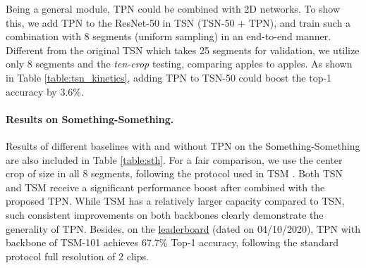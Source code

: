 \documentclass[10pt,twocolumn,letterpaper]{article}
\begin{document}
Being a general module, TPN could be combined with 2D networks.
To show this, we add TPN to the ResNet-50 \cite{resnet} in TSN (TSN-50 + TPN), and train such a combination with 8 segments (uniform sampling) in an end-to-end manner.
Different from the original TSN \cite{tsn} which takes 25 segments for validation, we utilize only 8 segments and the \emph{ten-crop} testing, comparing apples to apples.
As shown in Table \ref{table:tsn_kinetics}, adding TPN to TSN-50 could boost the top-1 accuracy by 3.6\%.


\paragraph{Results on Something-Something.}
\begin{table}[t]
    \begin{center}
    \end{center}
    \caption{
        \textbf{Results on the validation set of Something-Something V1 \& V2.} Note that results on V1 \& V2 take the center crop of 1 clip/video according to \cite{tsm}.
        }
    \label{table:sth}
\end{table}
Results of different baselines with and without TPN on the Something-Something are also included in Table \ref{table:sth}.
For a fair comparison, we use the center crop of size  in all 8 segments, following the protocol used in TSM \cite{tsm}.
Both TSN and TSM receive a significant performance boost after combined with the proposed TPN.
While TSM has a relatively larger capacity compared to TSN, such consistent improvements on both backbones clearly demonstrate the generality of TPN.
Besides, on the \href{https://20bn.com/datasets/something-something/v2}{leaderboard} (dated on 04/10/2020), TPN with backbone of TSM-101 achieves 67.7\% Top-1 accuracy, following the standard protocol \ie full resolution of 2 clips.
\end{document}
